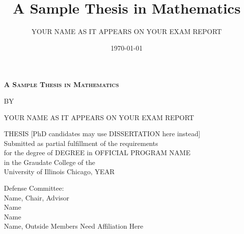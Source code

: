 \documentclass[12pt,reqno,oneside]{amsbook}
\theoremstyle{definition}
\begin{document}
\newcommand{\thetitle}{A Sample Thesis in Mathematics}

\newcommand{\institution}{University of Illinois Chicago} 
\newcommand{\degree}{DEGREE}
\newcommand{\programname}{OFFICIAL PROGRAM NAME}
\newcommand{\committee}{Name, Chair, Advisor \\ Name \\ Name\\ Name, Outside Members Need Affiliation Here}
\newcommand{\theauthor}{YOUR NAME AS IT APPEARS ON YOUR EXAM REPORT}
\newcommand{\priordegrees}{Prior degree\\ Another Prior degree, if Appropriate}
\newcommand{\graduationyear}{YEAR}

\author{\theauthor}
\title{\thetitle}
\date{\today}

\frontmatter

\begin{titlepage}
    \centering
	{\Large {\textbf{\textsc{\thetitle}}}  \par}
    \vspace{2cm}
    {\Large BY\par}
    \vspace{0.5cm}
    {\Large \theauthor\par}
    \vspace{2cm}
	{\Large THESIS [PhD candidates may use DISSERTATION here instead]\\
	\vspace{1cm}
	Submitted as partial fulfillment of the requirements\\ \vspace{0.2cm}
	for the degree of {\degree} in {\programname} \\ \vspace{0.2cm}
	in the Graudate College of the \\  \vspace{0.3cm}
	University of Illinois Chicago, {\graduationyear}
	}
		
	\raggedright
    \vfill
    \Large Defense Committee: \\
    \committee \\
\end{titlepage}

\setcounter{page}{2} %
\end{document}
